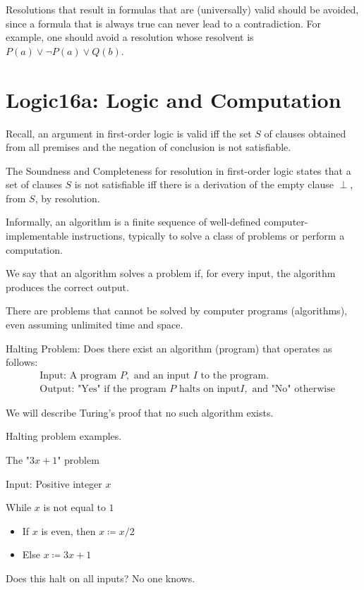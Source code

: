\documentclass{article}
\begin{document}
Resolutions that result in formulas that are (universally) valid should be avoided, since a formula that is always true can never lead to a contradiction. For example, one should avoid a resolution whose resolvent is $P(a) \vee \neg P(a) \vee Q(b)$.

\section{Logic16a: Logic and Computation}

Recall, an argument in first-order logic is valid iff the set $S$ of clauses obtained from all premises and the negation of conclusion is not satisfiable.

The Soundness and Completeness for resolution in first-order logic states that a set of clauses $S$ is not satisfiable iff there is a derivation of the empty clause $\perp$, from $S$, by resolution.

Informally, an algorithm is a finite sequence of well-defined computer-implementable instructions, typically to solve a class of problems or perform a computation.

We say that an algorithm solves a problem if, for every input, the algorithm produces the correct output. 

There are problems that cannot be solved by computer programs (algorithms), even assuming unlimited time and space.

Halting Problem: Does there exist an algorithm (program) that operates as follows:
\begin{align*}
&\text{Input: A program } P, \text{ and an input } I \text{ to the program.} \\
&\text{Output: "Yes" if the program } P \text{ halts on input} I, \text{ and "No" otherwise}
\end{align*}

We will describe Turing's proof that no such algorithm exists.

Halting problem examples.

The "$3x+1$" problem 

Input: Positive integer $x$

While $x$ is not equal to $1$
\begin{itemize}
    \item If $x$ is even, then $x \coloneqq x / 2$
    \item Else $x \coloneqq 3x + 1$
\end{itemize}

Does this halt on all inputs? No one knows.
\end{document}
